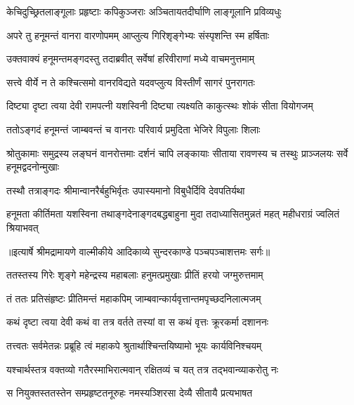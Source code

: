 \twolineshloka
{केचिदुच्छ्रितलाङ्गूलाः प्रहृष्टाः कपिकुञ्जराः}
{अञ्चितायतदीर्घाणि लाङ्गूलानि प्रविव्यधुः} %

\twolineshloka
{अपरे तु हनूमन्तं वानरा वारणोपमम्}
{आप्लुत्य गिरिशृङ्गेभ्यः संस्पृशन्ति स्म हर्षिताः} %

\twolineshloka
{उक्तवाक्यं हनूमन्तमङ्गदस्तु तदाब्रवीत्}
{सर्वेषां हरिवीराणां मध्ये वाचमनुत्तमाम्} %

\twolineshloka
{सत्त्वे वीर्ये न ते कश्चित्समो वानरविद्यते}
{यदवप्लुत्य विस्तीर्णं सागरं पुनरागतः} %

\twolineshloka
{दिष्ट्या दृष्टा त्वया देवी रामपत्नी यशस्विनी}
{दिष्ट्या त्यक्ष्यति काकुत्स्थः शोकं सीता वियोगजम्} %

\twolineshloka
{ततोऽङ्गदं हनूमन्तं जाम्बवन्तं च वानराः}
{परिवार्य प्रमुदिता भेजिरे विपुलाः शिलाः} %

\threelineshloka
{श्रोतुकामाः समुद्रस्य लङ्घनं वानरोत्तमाः}
{दर्शनं चापि लङ्कायाः सीताया रावणस्य च}
{तस्थुः प्राञ्जलयः सर्वे हनूमद्वदनोन्मुखाः} %

\twolineshloka
{तस्थौ तत्राङ्गदः श्रीमान्वानरैर्बहुभिर्वृतः}
{उपास्यमानो विबुधैर्दिवि देवपतिर्यथा} %

\fourlineindentedshloka
{हनूमता कीर्तिमता यशस्विना}
{तथाङ्गदेनाङ्गदबद्धबाहुना}
{मुदा तदाध्यासितमुन्नतं महत्}
{महीधराग्रं ज्वलितं श्रियाभवत्} %


{॥इत्यार्षे श्रीमद्रामायणे वाल्मीकीये आदिकाव्ये सुन्दरकाण्डे पञ्चपञ्चाशत्तमः सर्गः॥}


\twolineshloka
{ततस्तस्य गिरेः शृङ्गे महेन्द्रस्य महाबलाः}
{हनुमत्प्रमुखाः प्रीतिं हरयो जग्मुरुत्तमाम्} %

\twolineshloka
{तं ततः प्रतिसंहृष्टः प्रीतिमन्तं महाकपिम्}
{जाम्बवान्कार्यवृत्तान्तमपृच्छदनिलात्मजम्} %

\twolineshloka
{कथं दृष्टा त्वया देवी कथं वा तत्र वर्तते}
{तस्यां वा स कथं वृत्तः क्रूरकर्मा दशाननः} %

\twolineshloka
{तत्त्वतः सर्वमेतन्नः प्रब्रूहि त्वं महाकपे}
{श्रुतार्थाश्चिन्तयिष्यामो भूयः कार्यविनिश्चयम्} %

\twolineshloka
{यश्चार्थस्तत्र वक्तव्यो गतैरस्माभिरात्मवान्}
{रक्षितव्यं च यत् तत्र तद्भवान्व्याकरोतु नः} %

\twolineshloka
{स नियुक्तस्ततस्तेन सम्प्रहृष्टतनूरुहः}
{नमस्यञ्शिरसा देव्यै सीतायै प्रत्यभाषत} %

